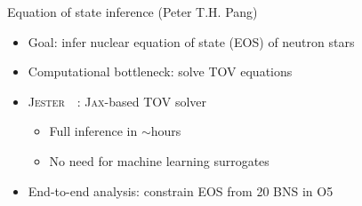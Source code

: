 \documentclass[usenames,dvipsnames,t]{beamer}
\newcommand{\ghlink}[1]{\href{https://github.com/#1}{\textcolor{black}{\faGithub}}}
\begin{document}
\begin{frame}{Equation of state inference \small (Peter T.H. Pang) \normalsize}
  \def\x{2mm}

  \begin{itemize}
    \item Goal: infer nuclear equation of state (EOS) of neutron stars~\cite{Abac:2025saz}

    \vspace{\x}

    \item Computational bottleneck: solve TOV equations

    \vspace{\x}

    \item<2-> \textsc{Jester}~\ghlink{nuclear-multimessenger-astronomy/jester}~\cite{Wouters:2025zju}: \textsc{Jax}-based TOV solver
    \begin{itemize}
      \item Full inference in $\sim$hours
      \item No need for machine learning surrogates
    \end{itemize}

    \vspace{\x}

    \item<3-> End-to-end analysis: constrain EOS from 20 BNS in O5
  \end{itemize}

  \vspace{-3mm}

  \begin{columns}


\end{columns}
\end{frame}
\end{document}
